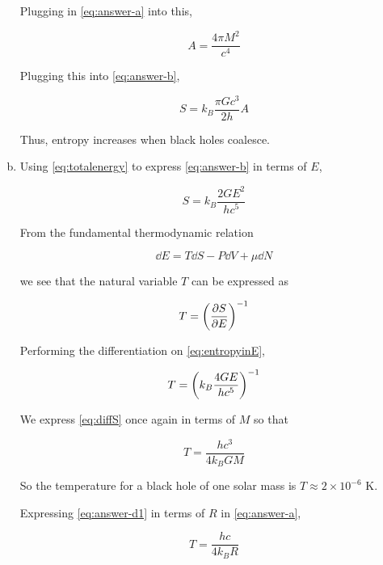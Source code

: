 \documentclass[12pt,a4paper,twocolumn]{article}
\begin{document}
\begin{enumerate}[(a)]
Plugging in \eqref{eq:answer-a} into this,

\begin{equation}
	A = \frac{4\pi M^2}{c^4}
\end{equation}

Plugging this into \eqref{eq:answer-b},

\begin{equation}
	\boxed{
		S = k_B \frac{\pi Gc^3}{2h}A
	}
\end{equation}

Thus, entropy increases when black holes coalesce.

\item Using \eqref{eq:totalenergy} to express \eqref{eq:answer-b} in terms of $E$,

\begin{equation}\label{eq:entropyinE}
	S = k_B \frac{2GE^2}{hc^5}
\end{equation}

From the fundamental thermodynamic relation

\begin{equation}\label{eq:ftr}
	\dd{E} = T\dd{S} - P\dd{V} + \mu\dd{N}
\end{equation}

we see that the natural variable $T$ can be expressed as

\begin{equation}\label{eq:naturaltemp}
	T = \qty(\pdv{S}{E})^{-1}
\end{equation}

Performing the differentiation on \eqref{eq:entropyinE},

\begin{equation}\label{eq:diffS}
	T = \qty(k_B \frac{4GE}{hc^5})^{-1}
\end{equation}

We express \eqref{eq:diffS} once again in terms of $M$ so that

\begin{equation}\label{eq:answer-d1}
	\boxed{
		T = \frac{hc^3}{4k_B GM}
	}
\end{equation}

So the temperature for a black hole of one solar mass is $\boxed{T \approx 2\times 10^{-6} \textrm{ K}}$.

Expressing \eqref{eq:answer-d1} in terms of $R$ in \eqref{eq:answer-a},

\begin{equation}\label{eq:answer-d2}
	\boxed{
		T = \frac{hc}{4k_B R}
	}
\end{equation}

\end{enumerate}
\end{document}
